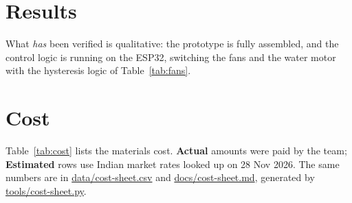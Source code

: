 \documentclass[11pt,a4paper]{report}
\begin{document}
\chapter{Results}

\begin{center}
\end{center}

What \emph{has} been verified is qualitative: the prototype is fully assembled, and the control logic is running on the ESP32, switching the fans and the water motor with the hysteresis logic of Table~\ref{tab:fans}.

\chapter{Cost}
\label{ch:cost}

Table~\ref{tab:cost} lists the materials cost. \textbf{Actual} amounts were paid by the team; \textbf{Estimated} rows use Indian market rates looked up on 28 Nov 2026. The same numbers are in \url{data/cost-sheet.csv} and \url{docs/cost-sheet.md}, generated by \url{tools/cost-sheet.py}.
\end{document}
